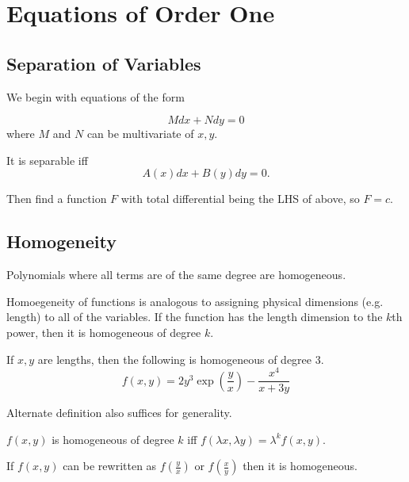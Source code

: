\section{Equations of Order One}

\subsection{Separation of Variables}

We begin with equations of the form

\begin{equation}
    Mdx+Ndy=0
\end{equation}
where $M$ and $N$ can be multivariate of $x,y$.

It is separable iff
\begin{equation}
    A(x)dx+B(y)dy=0.
\end{equation}

Then find a function $F$ with total differential being the LHS of above, so $F=c$.

\subsection{Homogeneity}

\begin{definition}
    Polynomials where all terms are of the same degree are homogeneous.
\end{definition}

Homoegeneity of functions is analogous to assigning physical dimensions (e.g. length) to all of the variables.
If the function has the length dimension to the $k$th power, then it is homogeneous of degree $k$.

\begin{example}
    If $x,y$ are lengths, then the following is homogeneous of degree 3.
    \begin{equation}
        f(x,y)=2y^3\exp(\frac{y}{x})-\frac{x^4}{x+3y}
    \end{equation}
\end{example}

Alternate definition also suffices for generality.

\begin{definition}
    $f(x,y)$ is homogeneous of degree $k$ iff $f(\lambda x, \lambda y)=\lambda^kf(x,y)$.
\end{definition}

\begin{definition}
    If $f(x,y)$ can be rewritten as $f(\frac{y}{x})$ or $f(\frac{x}{y})$ then it is homogeneous.
\end{definition}

